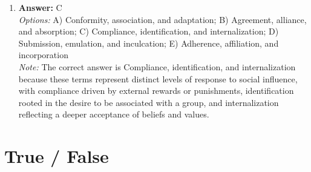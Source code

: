 \documentclass[12pt]{article}
\begin{document}
\begin{enumerate}[label=\arabic*.]
\item \textbf{Answer:} C
\\ \textit{Options:} A) Conformity, association, and adaptation; B) Agreement, alliance, and absorption; C) Compliance, identification, and internalization; D) Submission, emulation, and inculcation; E) Adherence, affiliation, and incorporation
\\ \textit{Note:} The correct answer is Compliance, identification, and internalization because these terms represent distinct levels of response to social influence, with compliance driven by external rewards or punishments, identification rooted in the desire to be associated with a group, and internalization reflecting a deeper acceptance of beliefs and values.
\end{enumerate}

\section*{True / False}
\end{document}
